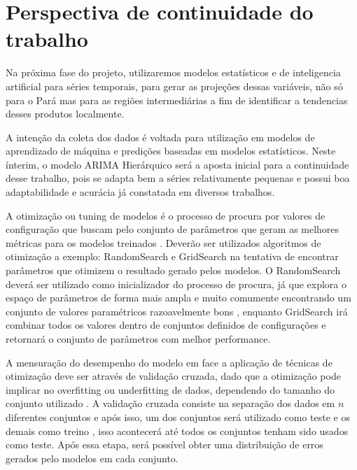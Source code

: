 \section{Perspectiva de continuidade do trabalho}

Na próxima fase do projeto, utilizaremos modelos estatísticos e de inteligencia artificial para séries temporais, para gerar as projeções dessas variáveis, não só para o Pará mas para as regiões intermediárias  a fim de identificar a tendencias desses produtos localmente. 

A intenção da coleta dos dados é voltada para utilização em modelos de aprendizado de máquina e predições baseadas em modelos estatísticos. Neste ínterim, o modelo ARIMA Hierárquico será a aposta inicial para a continuidade desse trabalho, pois se adapta bem a séries relativamente pequenas e possui boa adaptabilidade e acurácia já constatada em diversos trabalhos. 

A otimização ou tuning de modelos é o processo de procura por valores de configuração que buscam pelo conjunto de parâmetros que geram as melhores métricas para os modelos treinados \cite{thornton2013auto}. Deverão ser utilizados algoritmos de otimização a exemplo: RandomSearch e GridSearch na tentativa de encontrar parâmetros que otimizem o resultado gerado pelos modelos. O RandomSearch deverá ser utilizado como inicializador do processo de procura, já que explora o espaço de parâmetros de forma mais ampla e muito comumente encontrando um conjunto de valores paramétricos razoavelmente bons \cite{feurer2019hyperparameter}, enquanto GridSearch irá combinar todos os valores dentro de conjuntos definidos de configurações e retornará o conjunto de parâmetros com melhor performance.

A mensuração do desempenho do modelo em face a aplicação de técnicas de otimização deve ser através de validação cruzada, dado que a otimização pode implicar no overfitting ou underfitting de dados, dependendo do tamanho do conjunto utilizado \cite{feurer2019hyperparameter}. A validação cruzada consiste na separação dos dados em $n$ diferentes conjuntos e após isso, um dos conjuntos será utilizado como teste e os demais como treino \cite{scikit-learn}, isso acontecerá até todos os conjuntos tenham sido usados como teste. Após essa etapa, será possível obter uma distribuição de erros gerados pelo modelos em cada conjunto.

